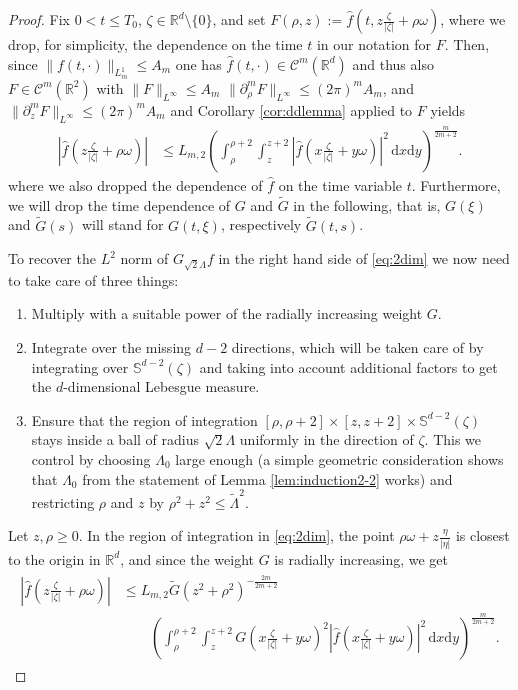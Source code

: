 \documentclass[11pt,a4paper,reqno]{amsart}
\theoremstyle{plain}
\theoremstyle{definition}
\begin{document}
\begin{proof} Fix $0<t\le T_0$, $\zeta\in {\mathbb{R}}^d\setminus\{0\}$, and
	set $F(\rho, z):= \hat{f}(t, z \frac{\zeta}{|\zeta|}+\rho\omega)$, where we drop, for simplicity, the dependence on the time $t$ in our notation for $F$.
	Then, since $\|f(t,\cdot)\|_{L^1_m}\le A_m$ one has $\hat{f}(t,\cdot)\in \mathcal{C}^m({\mathbb{R}}^d)$  and thus also  $F\in \mathcal{C}^m({\mathbb{R}}^2)$ with $\|F\|_{L^{\infty}} \leq A_m$ $\|\partial^m_\rho F\|_{L^{\infty}} \leq (2\pi)^mA_m$, and $\|\partial^m_z F\|_{L^{\infty}} \leq (2\pi)^mA_m$ and Corollary \ref{cor:ddlemma} applied to $F$ yields
	\begin{align}\label{eq:2dim}
		\left|\hat{f}\left( z \tfrac{\zeta}{|\zeta|}+\rho\omega\right)\right| &\leq L_{m,2} \left( \int_{\rho}^{\rho+2} \int_z^{z+2}
		\left|\hat{f}\left( x \tfrac{\zeta}{|\zeta|} + y\omega \right)\right|^2\,\mathrm{d}x \mathrm{d}y \right)^{\frac{m}{2m+2}}.
	\end{align}
	where we also dropped the dependence of $\hat{f}$ on the time variable $t$. Furthermore, we will drop the time dependence of $G$ and $\widetilde{G}$ in the following, that is, $G(\xi)$  and $\widetilde{G}(s)$ will stand for $G(t,\xi)$, respectively $\widetilde{G}(t,s)$.
	
	To recover the $L^2$ norm of $G_{\sqrt{2}\Lambda}f$ in the right hand side of \eqref{eq:2dim} we now need to take care of three things:
	\begin{enumerate}[label=(\roman*)]
	\item Multiply with a suitable power of the radially increasing weight $G$.
		\item Integrate over the missing $d-2$ directions, which will be taken care of by integrating over ${\mathbb{S}}^{d-2}(\zeta)$ and taking into account additional factors to get the $d$-dimensional Lebesgue measure.
		\item Ensure that the region of integration $[\rho,\rho+2]\times[z, z+2]\times {\mathbb{S}}^{d-2}(\zeta)$ stays inside a ball of radius $\sqrt{2}\Lambda$ uniformly in the direction of $\zeta$. This we control by choosing $\Lambda_0$ large enough (a simple geometric consideration shows that $\Lambda_0$ from the statement of Lemma \ref{lem:induction2-2} works) and restricting $\rho$ and $z$ by $\rho^2 + z^2 \leq \widetilde{\Lambda}^2$.
	\end{enumerate}

	Let $z,\rho\ge 0$. In  the region of integration in \eqref{eq:2dim}, the point $\rho\omega + z\tfrac{\eta}{|\eta|}$ is closest to the origin in ${\mathbb{R}}^d$, and since the weight $G$ is radially increasing, we get
	\begin{align}\label{eq:2dbound}
	\begin{split}
		\left|\hat{f}\left(z \tfrac{\zeta}{|\zeta|}+\rho\omega\right)\right| &\leq L_{m,2} \widetilde{G}\left(z^2+\rho^2\right)^{-\frac{2m}{2m+2}} \\
		&\qquad \left( \int_{\rho}^{\rho+2} \int_z^{z+2} G\left(x \tfrac{\zeta}{|\zeta|}+y\omega\right)^2  \left|\hat{f}\left(x \tfrac{\zeta}{|\zeta|}+y\omega\right)\right|^2\,\mathrm{d}x\mathrm{d}y \right)^{\frac{m}{2m+2}}.
		\end{split}
	\end{align}
	

\end{proof}
\end{document}

